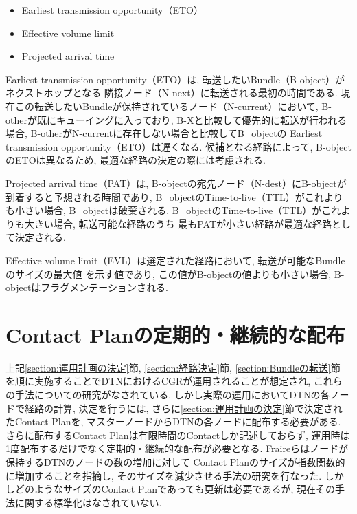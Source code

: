 \begin{itemize}
    \item Earliest transmission opportunity（ETO）
    \item Effective volume limit
    \item Projected arrival time
\end{itemize}

Earliest transmission opportunity（ETO）は, 転送したいBundle（B-object）がネクストホップとなる
隣接ノード（N-next）に転送される最初の時間である.  
現在この転送したいBundleが保持されているノード（N-current）において, 
B-otherが既にキューイングに入っており, B-Xと比較して優先的に転送が行われる場合, 
B-otherがN-currentに存在しない場合と比較してB_objectの
Earliest transmission opportunity（ETO）は遅くなる.  
候補となる経路によって, B-objectのETOは異なるため, 最適な経路の決定の際には考慮される.  

Projected arrival time（PAT）は, B-objectの宛先ノード（N-dest）にB-objectが到着すると予想される時間であり, 
B_objectのTime-to-live（TTL）がこれよりも小さい場合, B_objectは破棄される.  
B_objectのTime-to-live（TTL）がこれよりも大きい場合, 転送可能な経路のうち
最もPATが小さい経路が最適な経路として決定される.  

Effective volume limit（EVL）は選定された経路において, 転送が可能なBundleのサイズの最大値
を示す値であり, この値がB-objectの値よりも小さい場合, B-objectはフラグメンテーションされる.  



\section{Contact Planの定期的・継続的な配布}
\label{section:Contact Planの定期的・継続的な配布}

上記\ref{section:運用計画の決定}節, \ref{section:経路決定}節, \ref{section:Bundleの転送}節
を順に実施することでDTNにおけるCGRが運用されることが想定され, 
これらの手法についての研究がなされている.  
しかし実際の運用においてDTNの各ノードで経路の計算, 決定を行うには, 
さらに\ref{section:運用計画の決定}節で決定されたContact Planを, 
マスターノードからDTNの各ノードに配布する必要がある.  
さらに配布するContact Planは有限時間のContactしか記述しておらず, 
運用時は1度配布するだけでなく定期的・継続的な配布が必要となる.  
Fraireらはノードが保持するDTNのノードの数の増加に対して
Contact Planのサイズが指数関数的に増加することを指摘し, 
そのサイズを減少させる手法の研究を行なった\cite{FRAIRE2018}.  
しかしどのようなサイズのContact Planであっても更新は必要であるが, 
現在その手法に関する標準化はなされていない.  

